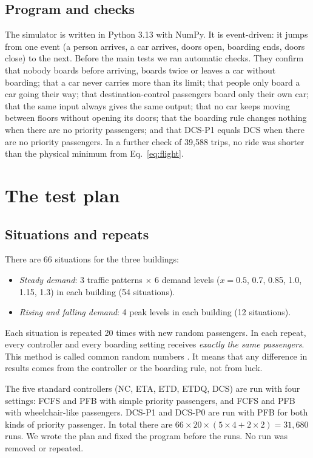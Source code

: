 \subsection{Program and checks}
The simulator is written in Python 3.13 with NumPy. It is event-driven: it jumps from one event (a person arrives, a car arrives, doors open, boarding ends, doors close) to the next. Before the main tests we ran automatic checks. They confirm that nobody boards before arriving, boards twice or leaves a car without boarding; that a car never carries more than its limit; that people only board a car going their way; that destination-control passengers board only their own car; that the same input always gives the same output; that no car keeps moving between floors without opening its doors; that the boarding rule changes nothing when there are no priority passengers; and that DCS-P1 equals DCS when there are no priority passengers. In a further check of 39,588 trips, no ride was shorter than the physical minimum from Eq.~\eqref{eq:flight}.

\section{The test plan}\label{sec:design}

\subsection{Situations and repeats}
There are 66 situations for the three buildings:
\begin{itemize}[itemsep=1pt]
\item \emph{Steady demand}: 3 traffic patterns $\times$ 6 demand levels ($x=0.5$, 0.7, 0.85, 1.0, 1.15, 1.3) in each building (54 situations).
\item \emph{Rising and falling demand}: 4 peak levels in each building (12 situations).
\end{itemize}
Each situation is repeated 20 times with new random passengers. In each repeat, every controller and every boarding setting receives \emph{exactly the same passengers}. This method is called common random numbers \cite{law2015}. It means that any difference in results comes from the controller or the boarding rule, not from luck.

The five standard controllers (NC, ETA, ETD, ETDQ, DCS) are run with four settings: FCFS and PFB with simple priority passengers, and FCFS and PFB with wheelchair-like passengers. DCS-P1 and DCS-P0 are run with PFB for both kinds of priority passenger. In total there are $66\times20\times(5\times4+2\times2)=31{,}680$ runs. We wrote the plan and fixed the program before the runs. No run was removed or repeated.

